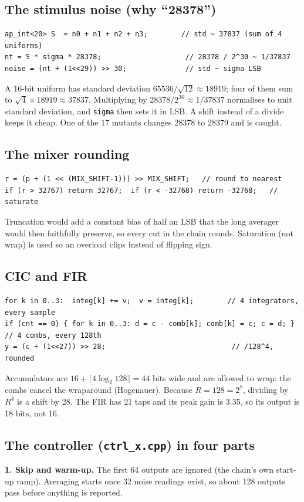 \documentclass[10pt,a4paper]{article}
\renewcommand{\c}[1]{\texttt{#1}}
\begin{document}
\subsection{The stimulus noise (why ``28378'')}
\begin{lstlisting}
ap_int<20> S  = n0 + n1 + n2 + n3;        // std ~ 37837 (sum of 4 uniforms)
nt = S * sigma * 28378;                    // 28378 / 2^30 ~ 1/37837
noise = (nt + (1<<29)) >> 30;              // std ~ sigma LSB
\end{lstlisting}
A 16-bit uniform has standard deviation $65536/\sqrt{12}\approx18919$; four of them sum to $\sqrt4\times18919\approx37837$. Multiplying by $28378/2^{30}\approx1/37837$ normalises to unit standard deviation, and \c{sigma} then sets it in LSB. A shift instead of a divide keeps it cheap. One of the 17 mutants changes 28378 to 28379 and is caught.

\subsection{The mixer rounding}
\begin{lstlisting}
r = (p + (1 << (MIX_SHIFT-1))) >> MIX_SHIFT;   // round to nearest
if (r > 32767) return 32767;  if (r < -32768) return -32768;   // saturate
\end{lstlisting}
Truncation would add a constant bias of half an LSB that the long averager would then faithfully preserve, so every cut in the chain rounds. Saturation (not wrap) is used so an overload clips instead of flipping sign.

\subsection{CIC and FIR}
\begin{lstlisting}
for k in 0..3:  integ[k] += v;  v = integ[k];        // 4 integrators, every sample
if (cnt == 0) { for k in 0..3: d = c - comb[k]; comb[k] = c; c = d; }   // 4 combs, every 128th
y = (c + (1<<27)) >> 28;                              // /128^4, rounded
\end{lstlisting}
Accumulators are $16+\lceil4\log_2 128\rceil=44$ bits wide and are allowed to wrap: the combs cancel the wraparound (Hogenauer). Because $R=128=2^7$, dividing by $R^4$ is a shift by 28. The FIR has 21 taps and its peak gain is 3.35, so its output is 18 bits, not 16.

\subsection{The controller (\texorpdfstring{\c{ctrl\_x.cpp}}{ctrl\_x.cpp}) in four parts}
\textbf{1. Skip and warm-up.} The first 64 outputs are ignored (the chain's own start-up ramp). Averaging starts once 32 noise readings exist, so about 128 outputs pass before anything is reported.
\end{document}
